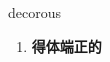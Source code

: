 
\begin{frame}
{\huge decorous}
\begin{center}
\begin{enumerate}\Large
  \item \textbf{得体端正的}
\end{enumerate}
\end{center}
\end{frame}

